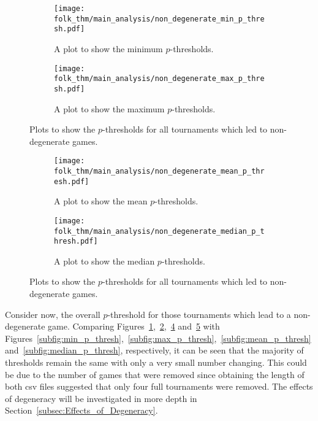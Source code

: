\begin{figure}
    \begin{subfigure}{.45\textwidth}
        \centering
        \texttt{[image: folk\_thm/main\_analysis/non\_degenerate\_min\_p\_thresh.pdf]}
        \caption{A plot to show the minimum \(p\)-thresholds.}\label{subfig:non_degen_min_p_thresh}
    \end{subfigure}
    \begin{subfigure}{.45\textwidth}
        \centering
        \texttt{[image: folk\_thm/main\_analysis/non\_degenerate\_max\_p\_thresh.pdf]}
        \caption{A plot to show the maximum \(p\)-thresholds.}\label{subfig:non_degen_max_p_thresh}
    \end{subfigure}
    \caption{Plots to show the \(p\)-thresholds for all tournaments which led to non-degenerate games.}\label{fig:non_degen_min_max_p_thresh}
\end{figure}


\begin{figure}
    \begin{subfigure}{.45\textwidth}
        \centering
        \texttt{[image: folk\_thm/main\_analysis/non\_degenerate\_mean\_p\_thresh.pdf]}
        \caption{A plot to show the mean \(p\)-thresholds.}\label{subfig:non_degen_mean_p_thresh}
    \end{subfigure}
    \begin{subfigure}{.45\textwidth}
        \centering
        \texttt{[image: folk\_thm/main\_analysis/non\_degenerate\_median\_p\_thresh.pdf]}
        \caption{A plot to show the median \(p\)-thresholds.}\label{subfig:non_degen_median_p_thresh}
    \end{subfigure}
    \caption{Plots to show the \(p\)-thresholds for all tournaments which led to non-degenerate games.}\label{fig:non_degen_mean_median_p_thresh}
\end{figure}

Consider now, the overall \(p\)-threshold for those tournaments which lead to a
non-degenerate game. Comparing
Figures~\ref{subfig:non_degen_min_p_thresh},~\ref{subfig:non_degen_max_p_thresh},~\ref{subfig:non_degen_mean_p_thresh}
and~\ref{subfig:non_degen_median_p_thresh} with Figures~\ref{subfig:min_p_thresh},~\ref{subfig:max_p_thresh},~\ref{subfig:mean_p_thresh}
and~\ref{subfig:median_p_thresh}, respectively, it can be seen that the majority
of thresholds remain the same with only a very small number changing. This could
be due to the number of games that were removed since obtaining the length of
both csv files suggested that only four full tournaments were removed.
The effects of degeneracy will be investigated in more depth in Section~\ref{subsec:Effects_of_Degeneracy}.


